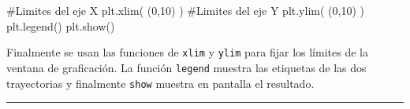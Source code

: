 \begin{listing}[style=python, numbers = none]
#Limites del eje X
plt.xlim( (0,10) )
#Limites del eje Y
plt.ylim( (0,10) )
plt.legend()
plt.show()
\end{listing}
Finalmente se usan las funciones de \matplotlib \texttt{xlim} y \texttt{ylim}
para fijar los límites de la ventana de graficación. La función 
\texttt{legend} muestra las etiquetas de las dos trayectorias y finalmente
\texttt{show} muestra en pantalla el resultado.


\rule{14cm}{0.5mm}
